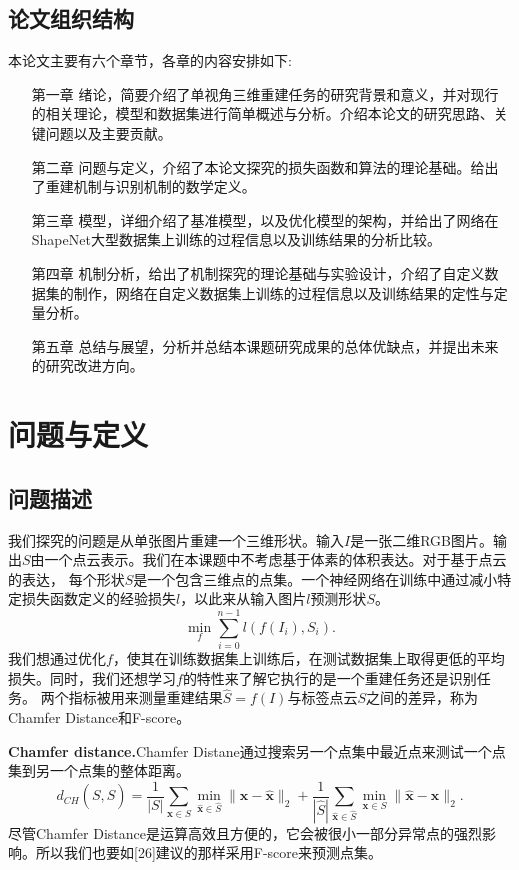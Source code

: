 \documentclass[bachelor, nocolorlinks, printoneside]{seuthesis} %
\begin{document}
\begin{Main}
\section{论文组织结构}
本论文主要有六个章节，各章的内容安排如下:
\begin{itemize}[\hspace{2cm}]
    \item[第一章] 绪论，简要介绍了单视角三维重建任务的研究背景和意义，并对现行的相关理论，模型和数据集进行简单概述与分析。介绍本论文的研究思路、关键问题以及主要贡献。
    \item[第二章] 问题与定义，介绍了本论文探究的损失函数和算法的理论基础。给出了重建机制与识别机制的数学定义。
    \item[第三章] 模型，详细介绍了基准模型，以及优化模型的架构，并给出了网络在ShapeNet大型数据集上训练的过程信息以及训练结果的分析比较。
    \item[第四章] 机制分析，给出了机制探究的理论基础与实验设计，介绍了自定义数据集的制作，网络在自定义数据集上训练的过程信息以及训练结果的定性与定量分析。
    \item[第五章] 总结与展望，分析并总结本课题研究成果的总体优缺点，并提出未来的研究改进方向。
\end{itemize}
\chapter{问题与定义}
\section{问题描述}
我们探究的问题是从单张图片重建一个三维形状。输入$I$是一张二维RGB图片。输出$S$由一个点云表示。我们在本课题中不考虑基于体素的体积表达。对于基于点云的表达，
每个形状$S$是一个包含三维点的点集。一个神经网络在训练中通过减小特定损失函数定义的经验损失$l$，以此来从输入图片$l$预测形状$S$。
\begin{equation}
    \min_f \sum_{i=0}^{n-1} {l(f(I_i), S_i)}.
\end{equation}
我们想通过优化$f$，使其在训练数据集上训练后，在测试数据集上取得更低的平均损失。同时，我们还想学习$f$的特性来了解它执行的是一个重建任务还是识别任务。
两个指标被用来测量重建结果$\widehat{S} = f(I)$与标签点云$S$之间的差异，称为Chamfer Distance和F-score。

\noindent
\textbf{Chamfer distance.}Chamfer Distane通过搜索另一个点集中最近点来测试一个点集到另一个点集的整体距离。
\begin{equation}\label{eqn:chamfer}
	d_{CH}(S,\widehat{S}) = \frac{1}{|S|}\sum\limits_{\mathbf{x}\in S}\min_{\widehat{\mathbf{x}}\in \widehat{S}}\|\mathbf{x}-\widehat{\mathbf{x}}\|_2 + 
    \frac{1}{|\widehat{S}|}\sum\limits_{\widehat{\mathbf{x}}\in \widehat{S}}\min_{\mathbf{x}\in S}\|\widehat{\mathbf{x}} - \mathbf{x}\|_2.
\end{equation}
尽管Chamfer Distance是运算高效且方便的，它会被很小一部分异常点的强烈影响。所以我们也要如[26]建议的那样采用F-score来预测点集。


\end{Main}
\end{document}
